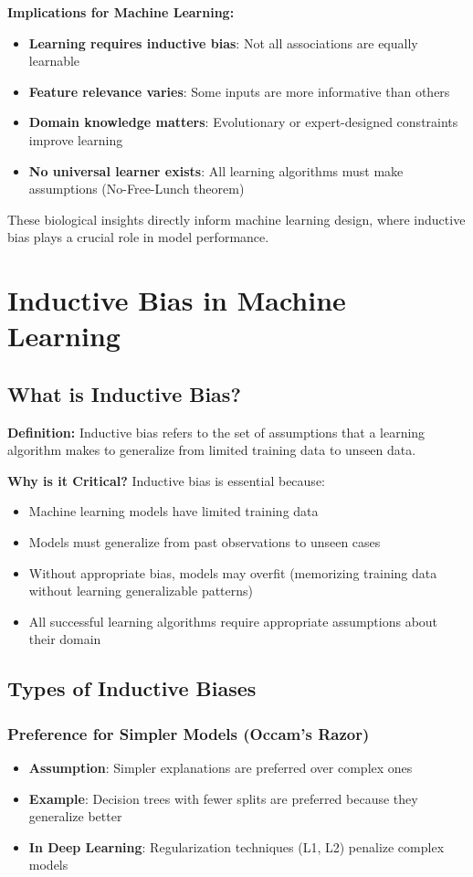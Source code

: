 \textbf{Implications for Machine Learning:}
\begin{itemize}
    \item \textbf{Learning requires inductive bias}: Not all associations are equally learnable
    \item \textbf{Feature relevance varies}: Some inputs are more informative than others
    \item \textbf{Domain knowledge matters}: Evolutionary or expert-designed constraints improve learning
    \item \textbf{No universal learner exists}: All learning algorithms must make assumptions (No-Free-Lunch theorem)
\end{itemize}

These biological insights directly inform machine learning design, where inductive bias plays a crucial role in model performance.

\section{Inductive Bias in Machine Learning}
\subsection{What is Inductive Bias?}
\textbf{Definition:} Inductive bias refers to the set of assumptions that a learning algorithm makes to generalize from limited training data to unseen data.

\textbf{Why is it Critical?}
Inductive bias is essential because:
\begin{itemize}
    \item Machine learning models have limited training data
    \item Models must generalize from past observations to unseen cases
    \item Without appropriate bias, models may overfit (memorizing training data without learning generalizable patterns)
    \item All successful learning algorithms require appropriate assumptions about their domain
\end{itemize}

\subsection{Types of Inductive Biases}

\subsubsection{Preference for Simpler Models (Occam's Razor)}
\begin{itemize}
    \item \textbf{Assumption}: Simpler explanations are preferred over complex ones
    \item \textbf{Example}: Decision trees with fewer splits are preferred because they generalize better
    \item \textbf{In Deep Learning}: Regularization techniques (L1, L2) penalize complex models
\end{itemize}

